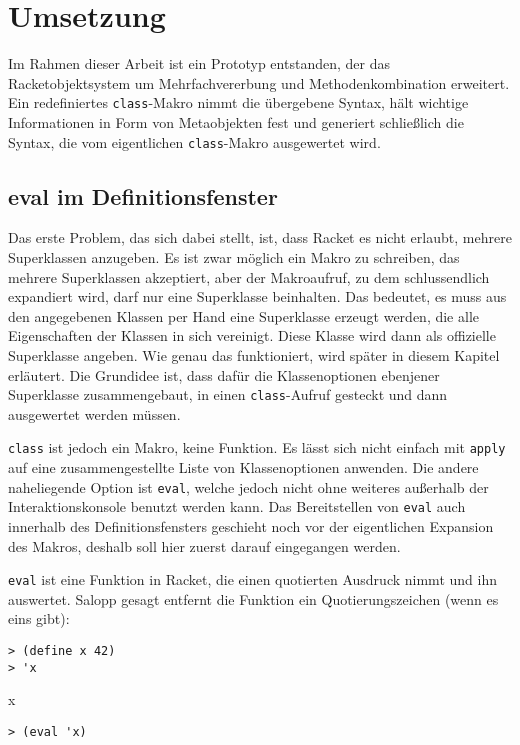 \chapter{Umsetzung}  
\label{implementation}

\vspace{-1em}
Im Rahmen dieser Arbeit ist ein Prototyp entstanden, der das Racketobjektsystem um Mehrfachvererbung und Methodenkombination erweitert. Ein redefiniertes \texttt{class}-Makro nimmt die übergebene Syntax, hält wichtige Informationen in Form von Metaobjekten fest und generiert schließlich die Syntax, die vom eigentlichen \texttt{class}-Makro ausgewertet wird.

\section{eval im Definitionsfenster}

Das erste Problem, das sich dabei stellt, ist, dass Racket es nicht erlaubt, mehrere Superklassen anzugeben. Es ist zwar möglich ein Makro zu schreiben, das mehrere Superklassen akzeptiert, aber der Makroaufruf, zu dem schlussendlich expandiert wird, darf nur eine Superklasse beinhalten. Das bedeutet, es muss aus den angegebenen Klassen per Hand eine Superklasse erzeugt werden, die alle Eigenschaften der Klassen in sich vereinigt. Diese Klasse wird dann als offizielle Superklasse angeben. Wie genau das funktioniert, wird später in diesem Kapitel erläutert. Die Grundidee ist, dass dafür die Klassenoptionen ebenjener Superklasse zusammengebaut, in einen \texttt{class}-Aufruf gesteckt und dann ausgewertet werden müssen.

\texttt{class} ist jedoch ein Makro, keine Funktion. Es lässt sich nicht einfach mit \texttt{apply} auf eine zusammengestellte Liste von Klassenoptionen anwenden. Die andere naheliegende Option ist \texttt{eval}, welche jedoch nicht ohne weiteres außerhalb der Interaktionskonsole benutzt werden kann. Das Bereitstellen von \texttt{eval} auch innerhalb des Definitionsfensters geschieht noch vor der eigentlichen Expansion des Makros, deshalb soll hier zuerst darauf eingegangen werden.

\texttt{eval} ist eine Funktion in Racket, die einen quotierten Ausdruck nimmt und ihn auswertet. Salopp gesagt entfernt die Funktion ein Quotierungszeichen (wenn es eins gibt):

\begin{lstlisting}
> (define x 42)
> 'x
\end{lstlisting}
{\rsymbol x}
\vspace{-1em}
\begin{lstlisting}
> (eval 'x)
\end{lstlisting}
{}

